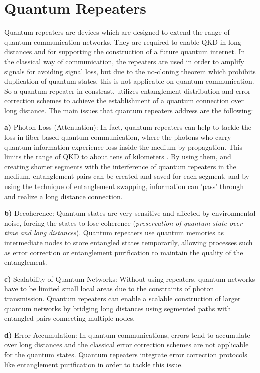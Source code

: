 \documentclass[12pt,a4paper] {report}
\begin{document}
		\section{Quantum Repeaters}
		
		Quantum repeaters are devices which are designed to extend the range of quantum communication networks. They 
		are required to enable QKD in long distances and for supporting the construction of a future quantum internet.
		In the classical way of communication, the repeaters are used in order to amplify signals 
		for avoiding signal loss, but due to the no-cloning theorem which prohibits duplication of quantum states,
		this is not applicable on quantum communication. So a quantum repeater in constrast, utilizes entanglement distribution 
		and error correction schemes to achieve the establishment of a quantum connection over long distance.
		The main issues that quantum repeaters address are the following:

		\textbf{a)} Photon Loss (Attenuation):
		In fact, quantum repeaters can help to tackle the loss in fiber-based quantum communication,
		where the photons who carry quantum information experience loss inside the medium by propagation. 
		This limits the range of QKD to about tens of kilometers \cite{repeater1}. 
		By using them, and creating shorter segments with the interference of quantum repeaters in the medium,
		entanglement pairs can be created and saved for each segment, 
		and by using the technique of entanglement swapping, information can 'pass' through and realize a long distance connection.

		\textbf{b)} Decoherence:
		Quantum states are very sensitive and affected by environmental noise, forcing the states to lose coherence (\textit{preservation of quantum
		state over time and long distances}).
		Quantum repeaters use quantum memories\cite{memories} as intermediate nodes to store entangled states 
		temporarily, allowing processes such as error correction or entanglement purification to maintain 
		the quality of the entanglement.
		
		\textbf{c)} Scalability of Quantum Networks:
		Without using repeaters, quantum networks have to be limited small local areas due to the
		constraints of photon transmission.
		Quantum repeaters can enable a scalable construction 
		of larger quantum networks by bridging long distances using segmented 
		paths with entangled pairs connecting multiple nodes.
		
		\textbf{d)} Error Accumulation:
		In quantum communications, errors tend to accumulate over long distances
		and the classical error correction schemes are not applicable for the quantum states.
		Quantum repeaters integrate error correction protocols like entanglement purification
		in order to tackle this issue.
\end{document}
